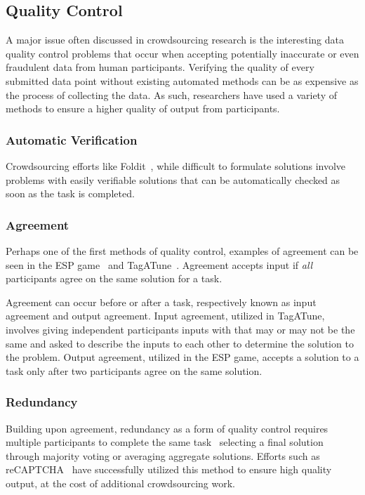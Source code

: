 \documentclass[10pt,twocolumn]{article}
\begin{document}
\subsection{Quality Control}

A major issue often discussed in crowdsourcing research is the interesting 
data quality control problems that occur when accepting potentially 
inaccurate or even fraudulent data from human participants. Verifying the
quality of every submitted data point without existing automated methods can 
be as expensive as the process of collecting the data. As such, researchers
have used a variety of methods to ensure a higher quality of output from
participants.


\subsubsection*{Automatic Verification}
Crowdsourcing efforts like Foldit~\cite{Cooper2010}, while difficult to
formulate solutions involve problems with easily verifiable solutions that
can be automatically checked as soon as the task is completed.


\subsubsection*{Agreement}
Perhaps one of the first methods of quality control, examples of agreement
can be seen in the ESP game~\cite{VonAhn2004} and TagATune~\cite{Law2009a}.
Agreement accepts input if \textit{all} participants agree on the same 
solution for a task. 

Agreement can occur before or after a task, respectively
known as input agreement and output agreement. Input agreement, utilized in 
TagATune, involves giving independent participants inputs with that may or 
may not be the same and asked to describe the inputs to each other to 
determine the solution to the problem. Output agreement, utilized in the
ESP game, accepts a solution to a task only after two participants agree
on the same solution.


\subsubsection*{Redundancy}
Building upon agreement, redundancy as a form of quality control requires 
multiple participants to complete the same task~\cite{Sheng2008} selecting
a final solution through majority voting or averaging aggregate solutions.
Efforts such as reCAPTCHA~\cite{VonAhn2008} have successfully utilized this 
method to ensure high quality output, at the cost of additional crowdsourcing
work.
\end{document}

